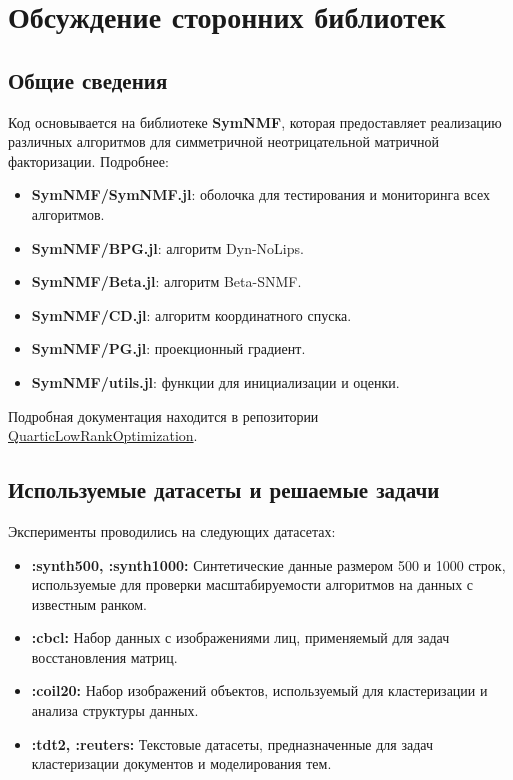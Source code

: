 \documentclass[a4paper,11pt]{article}
\begin{document}
\section{Обсуждение сторонних библиотек}
\label{sec:external-libraries}
\subsection{Общие сведения}
Код основывается на библиотеке \textbf{SymNMF}, которая предоставляет реализацию различных алгоритмов для симметричной неотрицательной матричной факторизации. Подробнее:
\begin{itemize}
    \item \textbf{SymNMF/SymNMF.jl}: оболочка для тестирования и мониторинга всех алгоритмов.
    \item \textbf{SymNMF/BPG.jl}: алгоритм Dyn-NoLips.
    \item \textbf{SymNMF/Beta.jl}: алгоритм Beta-SNMF.
    \item \textbf{SymNMF/CD.jl}: алгоритм координатного спуска.
    \item \textbf{SymNMF/PG.jl}: проекционный градиент.
    \item \textbf{SymNMF/utils.jl}: функции для инициализации и оценки.
\end{itemize}

Подробная документация находится в репозитории \href{https://github.com/RaduAlexandruDragomir/QuarticLowRankOptimization}{QuarticLowRankOptimization}.

\subsection{Используемые датасеты и решаемые задачи}
Эксперименты проводились на следующих датасетах:
\begin{itemize}
    \item \textbf{:synth500, :synth1000:} Синтетические данные размером 500 и 1000 строк, используемые для проверки масштабируемости алгоритмов на данных с известным ранком.
    \item \textbf{:cbcl:} Набор данных с изображениями лиц, применяемый для задач восстановления матриц.
    \item \textbf{:coil20:} Набор изображений объектов, используемый для кластеризации и анализа структуры данных.
    \item \textbf{:tdt2, :reuters:} Текстовые датасеты, предназначенные для задач кластеризации документов и моделирования тем.
\end{itemize}
\end{document}
